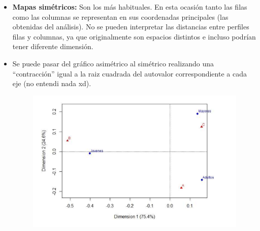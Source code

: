 \begin{itemize}
\begin{figure}[ht]
    \end{figure}
    
    \newpage

    \item \textbf{Mapas simétricos:} Son los más habituales. En esta ocasión tanto las filas como las columnas se representan en sus coordenadas principales (las obtenidas del análisis). No se pueden interpretar las distancias entre perfiles filas y columnas, ya que originalmente son espacios distintos e incluso podrían tener diferente dimensión.
    \item Se puede pasar del gráfico asimétrico al simétrico realizando una ``contracción'' igual a la raiz cuadrada del autovalor correspondiente a cada eje (no entendi nada xd).
    \begin{figure}[ht]
        \includegraphics[width=\textwidth]{assets/grafico_simetrico.png}
    \end{figure}
    

\end{itemize}
